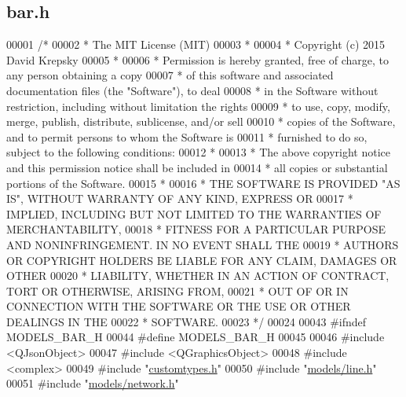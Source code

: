 \hypertarget{bar_8h_source}{}\subsection{bar.\+h}
\label{bar_8h_source}

\begin{DoxyCode}
00001 \textcolor{comment}{/*}
00002 \textcolor{comment}{ * The MIT License (MIT)}
00003 \textcolor{comment}{ *}
00004 \textcolor{comment}{ * Copyright (c) 2015 David Krepsky}
00005 \textcolor{comment}{ *}
00006 \textcolor{comment}{ * Permission is hereby granted, free of charge, to any person obtaining a copy}
00007 \textcolor{comment}{ * of this software and associated documentation files (the "Software"), to deal}
00008 \textcolor{comment}{ * in the Software without restriction, including without limitation the rights}
00009 \textcolor{comment}{ * to use, copy, modify, merge, publish, distribute, sublicense, and/or sell}
00010 \textcolor{comment}{ * copies of the Software, and to permit persons to whom the Software is}
00011 \textcolor{comment}{ * furnished to do so, subject to the following conditions:}
00012 \textcolor{comment}{ *}
00013 \textcolor{comment}{ * The above copyright notice and this permission notice shall be included in}
00014 \textcolor{comment}{ * all copies or substantial portions of the Software.}
00015 \textcolor{comment}{ *}
00016 \textcolor{comment}{ * THE SOFTWARE IS PROVIDED "AS IS", WITHOUT WARRANTY OF ANY KIND, EXPRESS OR}
00017 \textcolor{comment}{ * IMPLIED, INCLUDING BUT NOT LIMITED TO THE WARRANTIES OF MERCHANTABILITY,}
00018 \textcolor{comment}{ * FITNESS FOR A PARTICULAR PURPOSE AND NONINFRINGEMENT. IN NO EVENT SHALL THE}
00019 \textcolor{comment}{ * AUTHORS OR COPYRIGHT HOLDERS BE LIABLE FOR ANY CLAIM, DAMAGES OR OTHER}
00020 \textcolor{comment}{ * LIABILITY, WHETHER IN AN ACTION OF CONTRACT, TORT OR OTHERWISE, ARISING FROM,}
00021 \textcolor{comment}{ * OUT OF OR IN CONNECTION WITH THE SOFTWARE OR THE USE OR OTHER DEALINGS IN THE}
00022 \textcolor{comment}{ * SOFTWARE.}
00023 \textcolor{comment}{ */}
00024 
00043 \textcolor{preprocessor}{#ifndef MODELS\_BAR\_H}
00044 \textcolor{preprocessor}{#define MODELS\_BAR\_H}
00045 
00046 \textcolor{preprocessor}{#include <QJsonObject>}
00047 \textcolor{preprocessor}{#include <QGraphicsObject>}
00048 \textcolor{preprocessor}{#include <complex>}
00049 \textcolor{preprocessor}{#include "\hyperlink{customtypes_8h}{customtypes.h}"}
00050 \textcolor{preprocessor}{#include "\hyperlink{line_8h}{models/line.h}"}
00051 \textcolor{preprocessor}{#include "\hyperlink{network_8h}{models/network.h}"}

\end{DoxyCode}
